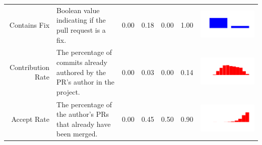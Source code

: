 \begin{table}[ht]
\begin{tabular}{rp{20em}rrrrc}
    Contains Fix & Boolean value indicating if the pull request is a fix. & 0.00 & 0.18 & 0.00 & 1.00 & \includegraphics[scale = 0.1, clip = true, trim= 50px 60px 50px 60px]{../figs/hist-features/hist-containsFix.pdf} \\
    Contribution Rate & The percentage of commits already authored by the PR's author in the project. & 0.00 & 0.03 & 0.00 & 0.14 & \includegraphics[scale = 0.1, clip = true, trim= 50px 60px 50px 60px]{../figs/hist-features/hist-commitRatio.pdf} \\
    Accept Rate & The percentage of the author's PRs that already have been merged. & 0.00 & 0.45 & 0.50 & 0.90 & \includegraphics[scale = 0.1, clip = true, trim= 50px 60px 50px 60px]{../figs/hist-features/hist-pullRequestRatio.pdf} \\

\end{tabular}
\end{table}
